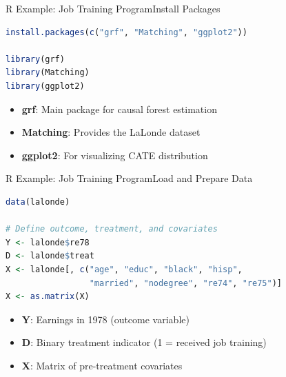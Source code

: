 \documentclass[dvipsnames,hyperref={pdfpagelabels=false}]{beamer}
\begin{document}
\begin{frame}[fragile]{R Example: Job Training Program}{Install Packages}
\begin{lstlisting}[language=R]
install.packages(c("grf", "Matching", "ggplot2"))

library(grf)
library(Matching)
library(ggplot2)
\end{lstlisting}
	\begin{itemize}
		\item \textbf{grf}: Main package for causal forest estimation
		\vspace{0.2cm}
		\item \textbf{Matching}: Provides the LaLonde dataset
		\vspace{0.2cm}
		\item \textbf{ggplot2}: For visualizing CATE distribution
	\end{itemize}
\end{frame}




\begin{frame}[fragile]{R Example: Job Training Program}{Load and Prepare Data}
\begin{lstlisting}[language=R]
data(lalonde)

# Define outcome, treatment, and covariates
Y <- lalonde$re78
D <- lalonde$treat
X <- lalonde[, c("age", "educ", "black", "hisp",
                 "married", "nodegree", "re74", "re75")]
X <- as.matrix(X)
\end{lstlisting}
	\begin{itemize}
		\item \textbf{Y}: Earnings in 1978 (outcome variable)
		\vspace{0.2cm}
		\item \textbf{D}: Binary treatment indicator (1 = received job training)
		\vspace{0.2cm}
		\item \textbf{X}: Matrix of pre-treatment covariates
	\end{itemize}
\end{frame}
\end{document}
